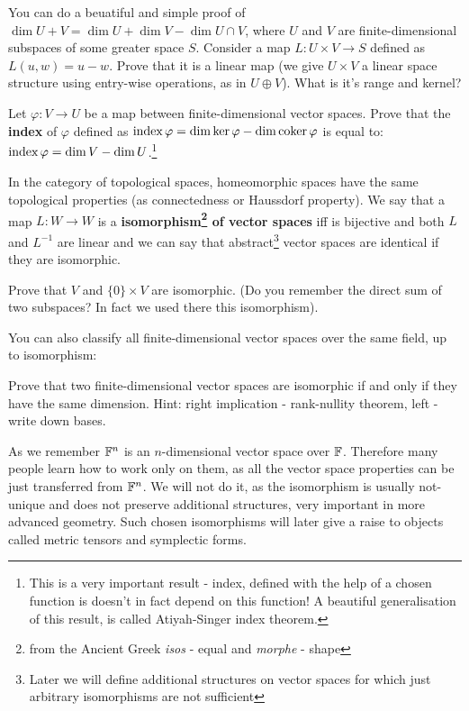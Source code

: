 \begin{prob}
  You can do a beuatiful and simple proof of $\dim U+V = \dim U + \dim V - \dim U\cap V$, where $U$ and $V$ are finite-dimensional subspaces of some greater space $S$.
  Consider a map $L: U\times V\to S$ defined as $L(u,w)=u-w$. Prove that it is a linear map (we give $U\times V$ a linear space structure using entry-wise operations, as in
  $U\oplus V$). What is it's range and kernel?
\end{prob}

\begin{prob}
  Let $\varphi : V\to U$ be a map between finite-dimensional vector spaces. Prove that the \textbf{index} of $\varphi$ defined as $\text{index\,} \varphi=\dim \text{ker\,} \varphi - \dim \text{coker\,} \varphi$ is equal to:
   $\text{index\,} \varphi=\dim V - \dim U$.\footnote{This is a very important result - index, defined with the help of a chosen function is doesn't in fact depend on this function! A beautiful generalisation of this result, is called Atiyah-Singer index theorem.}
\end{prob}

In the category of topological spaces, homeomorphic spaces have the same topological properties (as connectedness or Haussdorf property). We say that a map $L:W\to W$ is a
\textbf{isomorphism\footnote{from the Ancient Greek \textit{isos} - equal and \textit{morphe} - shape} of vector spaces} iff is bijective and both $L$ and $L^{-1}$ are linear and
we can say that abstract\footnote{Later we will define additional structures on vector spaces for which just arbitrary isomorphisms are not sufficient} vector spaces are identical if they are isomorphic.

\begin{prob}
  Prove that $V$ and $\{0\}\times V$ are isomorphic. (Do you remember the direct sum of two subspaces? In fact we used there this isomorphism).
\end{prob}

You can also classify all finite-dimensional vector spaces over the same field, up to isomorphism:

\begin{prob}
  Prove that two finite-dimensional vector spaces are isomorphic if and only if they have the same dimension. Hint: right implication - rank-nullity theorem, left - write down bases.
\end{prob}

As we remember $\mathbb F^n$ is an $n$-dimensional vector space over $\mathbb F$. Therefore many people learn how to work only on them, as all the vector space properties can be
just transferred from $\mathbb F^n$. We will not do it, as the isomorphism is usually not-unique and does not preserve additional structures, very important in more advanced geometry.
Such chosen isomorphisms will later give a raise to objects called metric tensors and symplectic forms.

